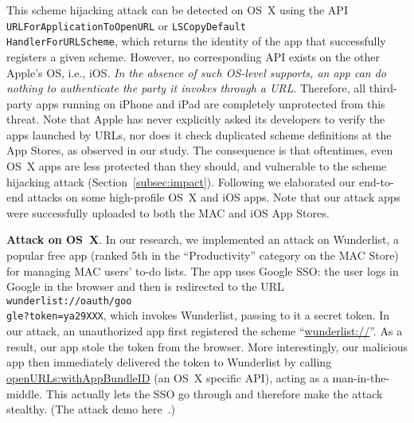 \documentclass{article}
\begin{document}
This scheme hijacking attack can be detected on OS~X using the API \texttt{URLForApplicationToOpenURL} or \texttt{LSCopyDefault\\HandlerForURLScheme}, which returns the identity of the app that successfully registers a given scheme. However, no corresponding API exists on the other Apple's OS, i.e., iOS. \textit{In the absence of such OS-level supports, an app can do nothing to authenticate the party it invokes through a URL}.  Therefore, all third-party apps running on iPhone and iPad are completely unprotected from this threat.  Note that Apple has never explicitly asked its developers to verify the apps launched by URLs, nor does it check duplicated scheme definitions at the App Stores, as observed in our study.  The consequence is that oftentimes, even OS~X apps are less protected than they should, and vulnerable to the scheme hijacking attack (Section~\ref{subsec:impact}).  Following we elaborated our end-to-end attacks on some high-profile OS~X and iOS apps. Note that our attack apps were successfully uploaded to both the MAC and iOS App Stores.

\vspace {3pt}\noindent\textbf{Attack on OS~X}. In our research, we implemented an attack on Wunderlist, a popular free app (ranked 5th in the ``Productivity'' category on the MAC Store) for managing MAC users' to-do lists. The app uses Google SSO: the user logs in Google in the browser and then is redirected to the URL \texttt{wunderlist://oauth/goo\\gle?token=ya29XXX}, which invokes Wunderlist, passing to it a secret token.  In our attack, an unauthorized app first registered the scheme ``\url{wunderlist://}''. As a result, our app stole the token from the browser. More interestingly, our malicious app then immediately delivered the token to Wunderlist by calling \url{openURLs:withAppBundleID} (an OS~X specific API), acting as a man-in-the-middle. This actually lets the SSO go through and therefore make the attack stealthy. (The attack demo here~\cite{supporting}.)
\end{document}
